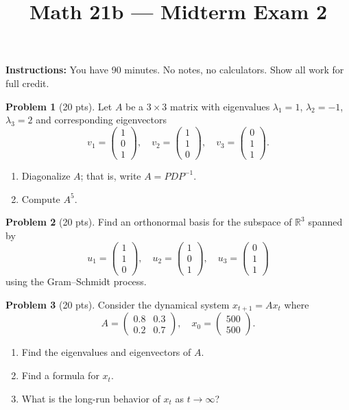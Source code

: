 \documentclass{amsart}
\title{Math 21b --- Midterm Exam 2}
\date{}
\begin{document}
\maketitle
\textbf{Instructions:} You have 90 minutes. No notes, no calculators. Show all work for full credit.

\bigskip

\textbf{Problem 1} (20 pts). Let $A$ be a $3\times 3$ matrix with eigenvalues $\lambda_1 = 1$, $\lambda_2 = -1$, $\lambda_3 = 2$ and corresponding eigenvectors
\[
v_1 = \begin{pmatrix}1\\0\\1\end{pmatrix},\quad v_2 = \begin{pmatrix}1\\1\\0\end{pmatrix},\quad v_3 = \begin{pmatrix}0\\1\\1\end{pmatrix}.
\]
\begin{enumerate}
    \item[(a)] Diagonalize $A$; that is, write $A = PDP^{-1}$.
    \item[(b)] Compute $A^5$.
\end{enumerate}

\bigskip

\textbf{Problem 2} (20 pts). Find an orthonormal basis for the subspace of $\mathbb{R}^3$ spanned by
\[
u_1 = \begin{pmatrix}1\\1\\0\end{pmatrix},\quad u_2 = \begin{pmatrix}1\\0\\1\end{pmatrix},\quad u_3 = \begin{pmatrix}0\\1\\1\end{pmatrix}
\]
using the Gram--Schmidt process.

\bigskip

\textbf{Problem 3} (20 pts). Consider the dynamical system $x_{t+1} = Ax_t$ where
\[
A = \begin{pmatrix}0.8 & 0.3\\0.2 & 0.7\end{pmatrix}, \quad x_0 = \begin{pmatrix}500\\500\end{pmatrix}.
\]
\begin{enumerate}
    \item[(a)] Find the eigenvalues and eigenvectors of $A$.
    \item[(b)] Find a formula for $x_t$.
    \item[(c)] What is the long-run behavior of $x_t$ as $t \to \infty$?
\end{enumerate}
\end{document}
